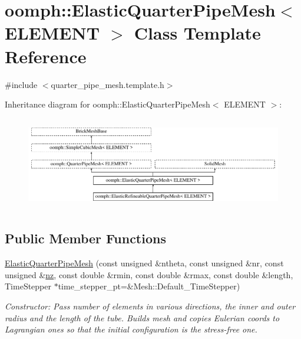 \hypertarget{classoomph_1_1ElasticQuarterPipeMesh}{}\section{oomph\+:\+:Elastic\+Quarter\+Pipe\+Mesh$<$ E\+L\+E\+M\+E\+NT $>$ Class Template Reference}
\label{classoomph_1_1ElasticQuarterPipeMesh}


{\ttfamily \#include $<$quarter\+\_\+pipe\+\_\+mesh.\+template.\+h$>$}

Inheritance diagram for oomph\+:\+:Elastic\+Quarter\+Pipe\+Mesh$<$ E\+L\+E\+M\+E\+NT $>$\+:\begin{figure}[H]
\begin{center}
\leavevmode
\includegraphics[height=4.093567cm]{classoomph_1_1ElasticQuarterPipeMesh}
\end{center}
\end{figure}
\subsection*{Public Member Functions}
\begin{DoxyCompactItemize}
\item 
\hyperlink{classoomph_1_1ElasticQuarterPipeMesh_a4ccb6983820b774bc72b7d469728ca30}{Elastic\+Quarter\+Pipe\+Mesh} (const unsigned \&ntheta, const unsigned \&nr, const unsigned \&\hyperlink{classoomph_1_1SimpleCubicMesh_ad78725440e4e87598fd9339653b28e61}{nz}, const double \&rmin, const double \&rmax, const double \&length, Time\+Stepper $\ast$time\+\_\+stepper\+\_\+pt=\&Mesh\+::\+Default\+\_\+\+Time\+Stepper)
\begin{DoxyCompactList}\small\item\em Constructor\+: Pass number of elements in various directions, the inner and outer radius and the length of the tube. Builds mesh and copies Eulerian coords to Lagrangian ones so that the initial configuration is the stress-\/free one. \end{DoxyCompactList}\end{DoxyCompactItemize}
